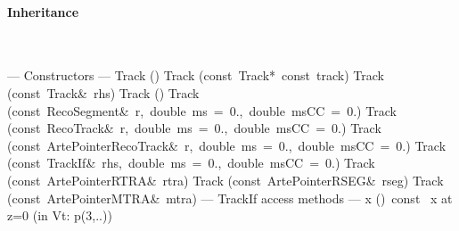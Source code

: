 \documentclass{article}
\begin{document}
\begin{cxxentry}
\begin{cxxclass}
\begin{cxxInheritance}
\paragraph{Inheritance}\strut\smallskip\strut\\
\end{cxxInheritance}
\begin{cxxpublic}
\cxxitem{}
        {--- Constructors --- }
        {}
        {}
        {}
\label{cxx.1.1.1}
\cxxitem{}
        {Track}
        {()}
        {}
        {}
\label{cxx.1.1.2}
\cxxitem{}
        {Track}
        {(const\ Track*\ const\ track)}
        {}
        {}
\label{cxx.1.1.3}
\cxxitem{}
        {Track}
        {(const\ Track\&\ rhs)}
        {}
        {}
\label{cxx.1.1.4}
        {\cxxtilde Track}
        {()}
        {}
        {}
\label{cxx.1.1.5}
\cxxitem{}
        {Track}
        {(const\ RecoSegment\&\ r,\ double\ ms\ =\ 0.,\ double\ msCC\ =\ 0.)}
        {}
        {}
\label{cxx.1.1.6}
\cxxitem{}
        {Track}
        {(const\ RecoTrack\&\ r,\ double\ ms\ =\ 0.,\ double\ msCC\ =\ 0.)}
        {}
        {}
\label{cxx.1.1.7}
\cxxitem{}
        {Track}
        {(const\ ArtePointer\<RecoTrack\>\&\ r,\ double\ ms\ =\ 0.,\ double\ msCC\ =\ 0.)}
        {}
        {}
\label{cxx.1.1.8}
\cxxitem{}
        {Track}
        {(const\ TrackIf\&\ rhs,\ double\ ms\ =\ 0.,\ double\ msCC\ =\ 0.)}
        {}
        {}
\label{cxx.1.1.9}
\cxxitem{}
        {Track}
        {(const\ ArtePointer\<RTRA\>\&\ rtra)}
        {}
        {}
\label{cxx.1.1.10}
\cxxitem{}
        {Track}
        {(const\ ArtePointer\<RSEG\>\&\ rseg)}
        {}
        {}
\label{cxx.1.1.11}
\cxxitem{}
        {Track}
        {(const\ ArtePointer\<MTRA\>\&\ mtra)}
        {}
        {}
\label{cxx.1.1.12}
\cxxitem{}
        {--- TrackIf access methods --- }
        {}
        {}
        {}
\label{cxx.1.1.13}
        {x}
        {()\ const\ }
        { x at z=0 (in Vt: p(3,..))}
        {}
\label{cxx.1.1.14}

\end{cxxpublic}
\end{cxxclass}
\end{cxxentry}
\end{document}
